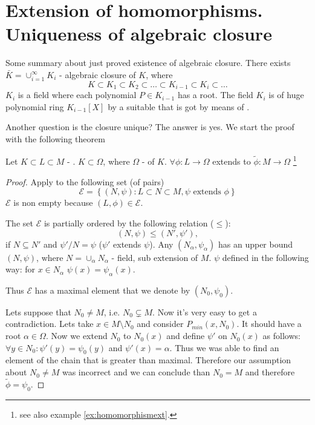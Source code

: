 \section{Extension of homomorphisms. Uniqueness of algebraic closure}

Some summary about just proved existence of algebraic closure. There
exists $\bar{K} = \cup_{i=1}^\infty K_i$ - algebraic closure of $K$,
where
\[
K \subset K_1 \subset K_2 \subset \dots \subset K_{i-1} \subset K_i
\subset \dots
\]
$K_i$ is a field where each polynomial $P \in K_{i-1}$ has a root. The
field $K_i$ is  of huge polynomial ring
$K_{i-1}\left[X\right]$ by a suitable  that is
got by means of .

Another question is the closure unique? The answer is yes. We start
the proof with the following theorem 

\begin{theorem}
  Let $K \subset L \subset M$ - .
  $K \subset \Omega$, where $\Omega$ - 
  of $K$.
  $\forall \phi: L \to \Omega$ extends to $\widetilde{\phi}: M \to
  \Omega$
  \label{thm:lec2_3}
  \footnote{
    see also example \ref{ex:homomorphismext}.
  }
  \begin{proof}
    Apply  to the following set (of pairs)
    \[
    \mathcal{E} = \left\{
    \left(N, \psi\right): L \subset N \subset M, \psi \mbox{ extends }
    \phi 
    \right\}
    \]
    $\mathcal{E}$ is non empty because $\left(L,\phi\right) \in
    \mathcal{E}$.

    The set $\mathcal{E}$ is partially ordered by the following
    relation ($\le$):
    \[
    \left(N, \psi\right) \le \left(N', \psi'\right),
    \]
    if $N \subseteq N'$ and $\psi'/N = \psi$ ($\psi'$ extends $\psi$).
    Any  $\left(N_\alpha, \psi_\alpha\right)$
    has an upper bound $\left(N, \psi\right)$, where
    \(
    N = \cup_\alpha N_\alpha
    \) - field, sub extension of $M$. $\psi$ defined in the following
    way: for $x \in N_\alpha$ $\psi(x) = \psi_\alpha(x)$.

    Thus $\mathcal{E}$ has a maximal element that we denote by
    $\left(N_0, \psi_0\right)$.

    Lets suppose that $N_0 \ne M$, i.e.
    $N_0 \subsetneq M$. Now it's very easy to get a
    contradiction. Lets take $x \in M \setminus N_0$ and consider
     $P_{min}\left(x, N_0\right)$. It
    should have a root $\alpha \in \Omega$. Now we extend $N_0$ to
    $N_0\left(x\right)$ and define $\psi'$ on
    $N_0\left(x\right)$ as follows: $\forall y \in N_0: \psi'(y)
    = \psi_0(y)$ and $\psi'(x) = \alpha$. Thus we was able to find an
    element of the chain that is greater than maximal. Therefore our
    assumption about $N_0 \ne M$ was incorrect and we can conclude
    than $N_0 = M$ and therefore $\tilde{\phi} = \psi_0$. 
  \end{proof}
\end{theorem}

